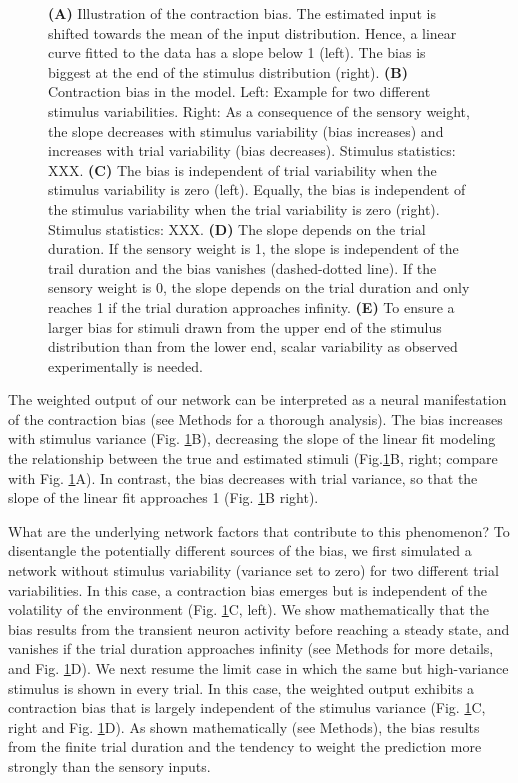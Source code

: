 \documentclass[10pt,a4paper,draft]{article}
\begin{document}
\begin{figure}[t!]
{{\bf (A)} Illustration of the contraction bias. The estimated input is shifted towards the mean of the input distribution. Hence, a linear curve fitted to the data has a slope below 1 (left). The bias is biggest at the end of the stimulus distribution (right).
{\bf (B)} Contraction bias in the model. Left: Example for two different stimulus variabilities. Right: As a consequence of the sensory weight, the slope decreases with stimulus variability (bias increases) and increases with trial variability (bias decreases).  Stimulus statistics: XXX.
{\bf (C)} The bias is independent of trial variability when the stimulus variability is zero (left). Equally, the bias is independent of the stimulus variability when the trial variability is zero (right). Stimulus statistics: XXX.
{\bf (D)} The slope depends on the trial duration. If the sensory weight is 1, the slope is independent of the trail duration and the bias vanishes (dashed-dotted line). If the sensory weight is 0, the slope depends on the trial duration and only reaches 1 if the trial duration approaches infinity. 
{\bf (E)} To ensure a larger bias for stimuli drawn from the upper end of the stimulus distribution than from the lower end, scalar variability as observed experimentally is needed.
}
\label{fig:Fig_5}
\end{figure}
%

The weighted output of our network can be interpreted as a neural manifestation of the contraction bias (see Methods for a thorough analysis). The bias increases with stimulus variance (Fig. \ref{fig:Fig_5}B), decreasing the slope of the linear fit modeling the relationship between the true and estimated stimuli (Fig.\ref{fig:Fig_5}B, right; compare with Fig. \ref{fig:Fig_5}A). In contrast, the bias decreases with trial variance, so that the slope of the linear fit approaches 1 (Fig. \ref{fig:Fig_5}B right).

What are the underlying network factors that contribute to this phenomenon? To disentangle the potentially different sources of the bias, we first simulated a network without stimulus variability (variance set to zero) for two different trial variabilities. In this case, a contraction bias emerges but is independent of the volatility of the environment (Fig. \ref{fig:Fig_5}C, left). We show mathematically that the bias results from the transient neuron activity before reaching a steady state, and vanishes if the trial duration approaches infinity (see Methods for more details, and Fig. \ref{fig:Fig_5}D). We next resume the limit case in which the same but high-variance stimulus is shown in every trial. In this case, the weighted output exhibits a contraction bias that is largely independent of the stimulus variance (Fig. \ref{fig:Fig_5}C, right and Fig. \ref{fig:Fig_5}D). As shown mathematically (see Methods), the bias results from the finite trial duration and the tendency to weight the prediction more strongly than the sensory inputs. 
\end{document}
